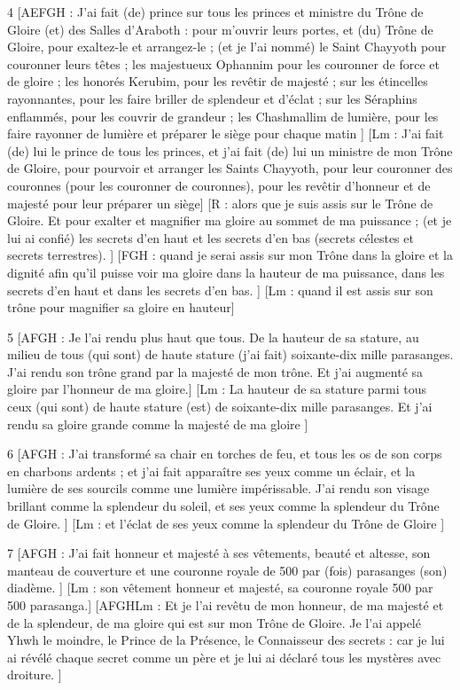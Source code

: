 \par 4 [AEFGH : J'ai fait (de) prince sur tous les princes et ministre du Trône de Gloire (et) des Salles d'Araboth : pour m'ouvrir leurs portes, et (du) Trône de Gloire, pour exaltez-le et arrangez-le ; (et je l'ai nommé) le Saint Chayyoth pour couronner leurs têtes ; les majestueux Ophannim pour les couronner de force et de gloire ; les honorés Kerubim, pour les revêtir de majesté ; sur les étincelles rayonnantes, pour les faire briller de splendeur et d'éclat ; sur les Séraphins enflammés, pour les couvrir de grandeur ; les Chashmallim de lumière, pour les faire rayonner de lumière et préparer le siège pour chaque matin ] [Lm : J'ai fait (de) lui le prince de tous les princes, et j'ai fait (de) lui un ministre de mon Trône de Gloire, pour pourvoir et arranger les Saints Chayyoth, pour leur couronner des couronnes (pour les couronner de couronnes), pour les revêtir d'honneur et de majesté pour leur préparer un siège] [R : alors que je suis assis sur le Trône de Gloire. Et pour exalter et magnifier ma gloire au sommet de ma puissance ; (et je lui ai confié) les secrets d'en haut et les secrets d'en bas (secrets célestes et secrets terrestres). ] [FGH : quand je serai assis sur mon Trône dans la gloire et la dignité afin qu'il puisse voir ma gloire dans la hauteur de ma puissance, dans les secrets d'en haut et dans les secrets d'en bas. ] [Lm : quand il est assis sur son trône pour magnifier sa gloire en hauteur]

\par 5 [AFGH : Je l'ai rendu plus haut que tous. De la hauteur de sa stature, au milieu de tous (qui sont) de haute stature (j'ai fait) soixante-dix mille parasanges. J'ai rendu son trône grand par la majesté de mon trône. Et j'ai augmenté sa gloire par l'honneur de ma gloire.] [Lm : La hauteur de sa stature parmi tous ceux (qui sont) de haute stature (est) de soixante-dix mille parasanges. Et j'ai rendu sa gloire grande comme la majesté de ma gloire ]

\par 6 [AFGH : J'ai transformé sa chair en torches de feu, et tous les os de son corps en charbons ardents ; et j'ai fait apparaître ses yeux comme un éclair, et la lumière de ses sourcils comme une lumière impérissable. J'ai rendu son visage brillant comme la splendeur du soleil, et ses yeux comme la splendeur du Trône de Gloire. ] [Lm : et l'éclat de ses yeux comme la splendeur du Trône de Gloire ]

\par 7 [AFGH : J'ai fait honneur et majesté à ses vêtements, beauté et altesse, son manteau de couverture et une couronne royale de 500 par (fois) parasanges (son) diadème. ] [Lm : son vêtement honneur et majesté, sa couronne royale 500 par 500 parasanga.] [AFGHLm : Et je l'ai revêtu de mon honneur, de ma majesté et de la splendeur, de ma gloire qui est sur mon Trône de Gloire. Je l'ai appelé Yhwh le moindre, le Prince de la Présence, le Connaisseur des secrets : car je lui ai révélé chaque secret comme un père et je lui ai déclaré tous les mystères avec droiture. ]

